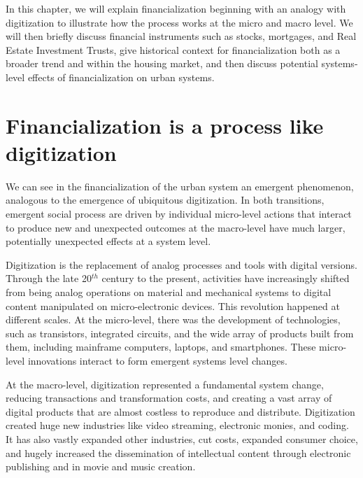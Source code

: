 In this chapter, we will explain financialization beginning with an analogy with digitization to illustrate how the process works at the micro and macro level. We will then briefly discuss financial instruments such as stocks, mortgages, and Real Estate Investment Trusts, give historical context for financialization both as a broader trend and within the housing market, and then discuss potential systems-level effects of financialization on urban systems.


\section{Financialization is a process like digitization}

We can see in the  financialization of the urban system an \gls{emergent} phenomenon, analogous to the emergence of ubiquitous \gls{digitization}.
In both transitions, emergent social process are driven by individual micro-level actions that interact to produce new  and unexpected outcomes at the macro-level
have much larger, potentially unexpected effects at a system level. %

Digitization is the replacement of analog processes and tools with digital versions. Through the late 20$^{th}$ century to the present, activities have increasingly shifted from being analog operations on material and mechanical systems to digital content manipulated on micro-electronic devices. 
This revolution happened at different scales. At the micro-level, there was the development of technologies, such as transistors, integrated circuits, and the wide array of products built from them, including mainframe computers, laptops, and smartphones.  These micro-level innovations interact to form emergent systems level changes. 

At the macro-level, digitization represented a fundamental system change, reducing transactions and transformation costs, and creating a vast array of digital products that are almost costless to reproduce and distribute. Digitization created huge new industries like video streaming, electronic monies, and coding. It has also vastly expanded other industries, %
cut costs, expanded consumer choice, %
and hugely increased the dissemination of intellectual content through electronic publishing and in movie and music creation.   

